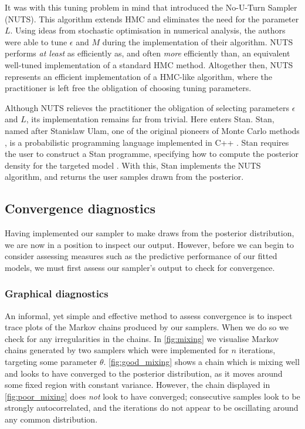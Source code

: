 It was with this tuning problem in mind that \textcite{hoffman14} introduced
the No-U-Turn Sampler (NUTS). This algorithm extends HMC and eliminates the
need for the parameter $L$. Using ideas from stochastic optimisation in
numerical analysis, the authors were able to tune $\epsilon$ and $M$ during the
implementation of their algorithm. NUTS performs \emph{at least} as efficiently
as, and often \emph{more} efficiently than, an equivalent well-tuned
implementation of a standard HMC method. Altogether then, NUTS represents an
efficient implementation of a HMC-like algorithm, where the practitioner is
left free the obligation of choosing tuning parameters. 

Although NUTS relieves the practitioner the obligation of selecting parameters
$\epsilon$ and $L$, its implementation remains far from trivial. Here enters
Stan. Stan, named after Stanislaw Ulam, one of the original pioneers of Monte
Carlo methods \parencite{metropolis49}, is a probabilistic programming language
implemented in C++ \parencite{gelman15}. Stan requires the user to construct a
Stan programme, specifying how to compute the posterior density for the
targeted model \parencite{stanteam15}. With this, Stan implements the NUTS
algorithm, and returns the user samples drawn from the posterior.

\subsection{Convergence diagnostics}
\label{ssec:convergence_diagnostics}

Having implemented our sampler to make draws from the posterior distribution,
we are now in a position to inspect our output. However, before we can begin to
consider assessing measures such as the predictive performance of our fitted
models, we must first assess our sampler's output to check for convergence.

\subsubsection{Graphical diagnostics}

An informal, yet simple and effective method to assess convergence is to
inspect trace plots of the Markov chains produced by our samplers. When we do
so we check for any irregularities in the chains. In \cref{fig:mixing} we
visualise Markov chains generated by two samplers which were implemented for
$n$ iterations, targeting some parameter $\theta$. \cref{fig:good_mixing} shows
a chain which is mixing well and looks to have converged to the posterior
distribution, as it moves around some fixed region with constant variance.
However, the chain displayed in \cref{fig:poor_mixing} does \emph{not} look to
have converged; consecutive samples look to be strongly autocorrelated, and the
iterations do not appear to be oscillating around any common distribution.

